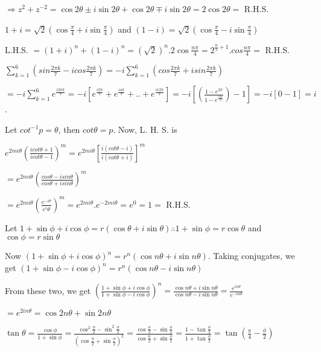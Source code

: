   $\Rightarrow z^2 + z^{-2} = \cos2\theta \pm i\sin2\theta + \cos2\theta \mp i\sin2\theta = 2\cos2\theta =$
  R.H.S.
\item $1 + i = \sqrt{2}\left(\cos\frac{\pi}{4} + i\sin\frac{\pi}{4}\right)$ and $(1 - i) =
  \sqrt{2}\left(\cos\frac{\pi}{4} - i\sin\frac{\pi}{4}\right)$

  L.H.S. $= (1 + i)^n + (1 - i)^n = (\sqrt{2})^n.2\cos\frac{n\pi}{4} = 2^{\frac{n}{2} + 1}.cos\frac{n\pi}{4}
  =$ R.H.S.
\item $\displaystyle\sum_{k = 1}^6\left(sin\frac{2\pi k}{7} -icos\frac{2\pi k}{7}\right) = -i \sum_{k =
  1}^6\left(cos\frac{2\pi k}{7} + isin\frac{2\pi k}{7}\right)$

  $= -i \sum_{k = 1}^6 e^{\frac{i2\pi k}{7}} = -i \left[e^{\frac{i2\pi}{7}} + e^{\frac{i4\pi}{7}} + .. +
  e^{\frac{i12\pi}{7}}\right] = -i \left[\left(\frac{1 - e^{2\pi}}{1 - e^{\frac{i2\pi}{7}}}\right) -
  1\right] = -i [0 - 1] = i$.
\item Let $cot^{-1}p = \theta$, then $cot\theta = p$. Now, L. H. S. is

  $e^{2mi\theta}\left(\frac{icot\theta + 1}{icot\theta - 1}\right)^m  = e^{2mi\theta}\left[\frac{i(cot\theta
    - i)}{i(cot\theta + i)}\right]^m$

  $= e^{2mi\theta}\left(\frac{cos\theta - isin\theta}{cos\theta + isin\theta}\right)^m$

  $= e^{2mi\theta}\left(\frac{e^{-i\theta}}{e^i\theta}\right)^m = e^{2mi\theta} . e^{-2mi\theta} = e^0 = 1
  =$ R.H.S.
\item Let $1 + \sin\phi + i \cos\phi = r(\cos\theta + i \sin\theta) \therefore 1 + \sin\phi = r\cos\theta$
  and $\cos\phi = r\sin\theta$

  Now $(1 + \sin\phi + i \cos\phi)^n = r^n(\cos n\theta + i\sin n\theta)$. Taking conjugates, we get $(1
  + \sin\phi - i \cos\phi)^n = r^n(\cos n\theta - i\sin n\theta)$

  From these two, we get $\left(\frac{1 + \sin\phi + i \cos\phi}{1 + \sin\phi - i \cos\phi}\right)^n =
  \frac{\cos n\theta + i\sin n\theta}{\cos n\theta - i\sin n\theta} = \frac{e^{in\theta}}{e^{-in\theta}}$

  $= e^{2in\theta} = \cos 2n\theta + \sin 2n\theta$

  $\tan \theta = \frac{\cos \phi}{1 + \sin \phi} = \frac{\cos^2\frac{\phi}{2} -
    \sin^2\frac{\phi}{2}}{\left(\cos\frac{\phi}{2} + \sin\frac{\phi}{2}\right)^2} =
  \frac{\cos\frac{\phi}{2} - \sin\frac{\phi}{2}}{\cos\frac{\phi}{2} + \sin\frac{\phi}{2}} = \frac{1 -
    \tan\frac{\phi}{2}}{1 + \tan\frac{\phi}{2}} = \tan\left(\frac{\pi}{4} - \frac{\phi}{2}\right)$

